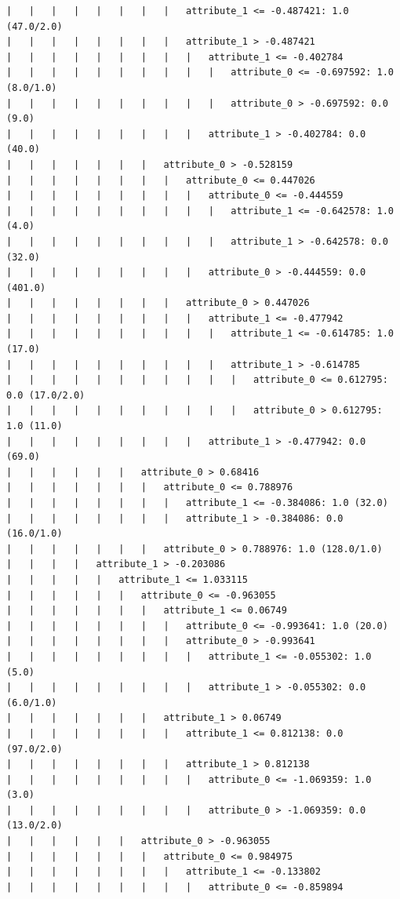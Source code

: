 \documentclass[a4paper]{article}
\theoremstyle{definition}
\newenvironment{soln}{
    \leavevmode\color{blue}\ignorespaces
}{}
\begin{document}
\begin{soln}
\begin{lstlisting}
|   |   |   |   |   |   |   |   attribute_1 <= -0.487421: 1.0 (47.0/2.0)
|   |   |   |   |   |   |   |   attribute_1 > -0.487421
|   |   |   |   |   |   |   |   |   attribute_1 <= -0.402784
|   |   |   |   |   |   |   |   |   |   attribute_0 <= -0.697592: 1.0 (8.0/1.0)
|   |   |   |   |   |   |   |   |   |   attribute_0 > -0.697592: 0.0 (9.0)
|   |   |   |   |   |   |   |   |   attribute_1 > -0.402784: 0.0 (40.0)
|   |   |   |   |   |   |   attribute_0 > -0.528159
|   |   |   |   |   |   |   |   attribute_0 <= 0.447026
|   |   |   |   |   |   |   |   |   attribute_0 <= -0.444559
|   |   |   |   |   |   |   |   |   |   attribute_1 <= -0.642578: 1.0 (4.0)
|   |   |   |   |   |   |   |   |   |   attribute_1 > -0.642578: 0.0 (32.0)
|   |   |   |   |   |   |   |   |   attribute_0 > -0.444559: 0.0 (401.0)
|   |   |   |   |   |   |   |   attribute_0 > 0.447026
|   |   |   |   |   |   |   |   |   attribute_1 <= -0.477942
|   |   |   |   |   |   |   |   |   |   attribute_1 <= -0.614785: 1.0 (17.0)
|   |   |   |   |   |   |   |   |   |   attribute_1 > -0.614785
|   |   |   |   |   |   |   |   |   |   |   attribute_0 <= 0.612795: 0.0 (17.0/2.0)
|   |   |   |   |   |   |   |   |   |   |   attribute_0 > 0.612795: 1.0 (11.0)
|   |   |   |   |   |   |   |   |   attribute_1 > -0.477942: 0.0 (69.0)
|   |   |   |   |   |   attribute_0 > 0.68416
|   |   |   |   |   |   |   attribute_0 <= 0.788976
|   |   |   |   |   |   |   |   attribute_1 <= -0.384086: 1.0 (32.0)
|   |   |   |   |   |   |   |   attribute_1 > -0.384086: 0.0 (16.0/1.0)
|   |   |   |   |   |   |   attribute_0 > 0.788976: 1.0 (128.0/1.0)
|   |   |   |   attribute_1 > -0.203086
|   |   |   |   |   attribute_1 <= 1.033115
|   |   |   |   |   |   attribute_0 <= -0.963055
|   |   |   |   |   |   |   attribute_1 <= 0.06749
|   |   |   |   |   |   |   |   attribute_0 <= -0.993641: 1.0 (20.0)
|   |   |   |   |   |   |   |   attribute_0 > -0.993641
|   |   |   |   |   |   |   |   |   attribute_1 <= -0.055302: 1.0 (5.0)
|   |   |   |   |   |   |   |   |   attribute_1 > -0.055302: 0.0 (6.0/1.0)
|   |   |   |   |   |   |   attribute_1 > 0.06749
|   |   |   |   |   |   |   |   attribute_1 <= 0.812138: 0.0 (97.0/2.0)
|   |   |   |   |   |   |   |   attribute_1 > 0.812138
|   |   |   |   |   |   |   |   |   attribute_0 <= -1.069359: 1.0 (3.0)
|   |   |   |   |   |   |   |   |   attribute_0 > -1.069359: 0.0 (13.0/2.0)
|   |   |   |   |   |   attribute_0 > -0.963055
|   |   |   |   |   |   |   attribute_0 <= 0.984975
|   |   |   |   |   |   |   |   attribute_1 <= -0.133802
|   |   |   |   |   |   |   |   |   attribute_0 <= -0.859894

\end{lstlisting}
\end{soln}
\end{document}
